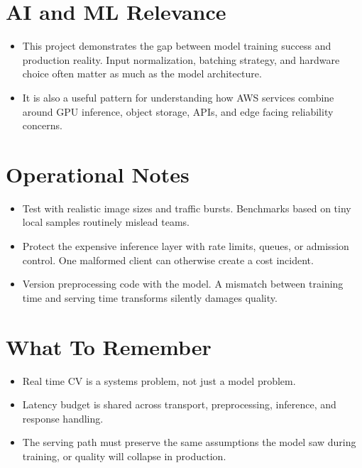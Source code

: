 \documentclass[10pt,twocolumn]{article}
\begin{document}
\section*{AI and ML Relevance}
\begin{itemize}
\item This project demonstrates the gap between model training success and production reality. Input normalization, batching strategy, and hardware choice often matter as much as the model architecture.
\item It is also a useful pattern for understanding how AWS services combine around GPU inference, object storage, APIs, and edge facing reliability concerns.
\end{itemize}

\section*{Operational Notes}
\begin{itemize}
\item Test with realistic image sizes and traffic bursts. Benchmarks based on tiny local samples routinely mislead teams.
\item Protect the expensive inference layer with rate limits, queues, or admission control. One malformed client can otherwise create a cost incident.
\item Version preprocessing code with the model. A mismatch between training time and serving time transforms silently damages quality.
\end{itemize}

\section*{What To Remember}
\begin{itemize}
\item Real time CV is a systems problem, not just a model problem.
\item Latency budget is shared across transport, preprocessing, inference, and response handling.
\item The serving path must preserve the same assumptions the model saw during training, or quality will collapse in production.
\end{itemize}
\end{document}
